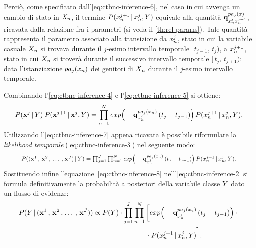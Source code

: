 Perciò, come specificato dall'\autoref{eq:ctbnc-inference-6}, nel caso in cui avvenga un cambio di stato in $\mathnormal{X}_n$, il termine $P(\mathnormal{x}_n^{j+1}\,\arrowvert\,\mathnormal{x}_n^j,\mathnormal{Y})$ equivale alla quantità $\boldsymbol{\textbf{\text{q}}}_{\mathnormal{x}_n^j\mathnormal{x}_n^{j+1}}^{pa_j(\mathnormal{x})}$, ricavata dalla relazione fra i parametri (si veda il \autoref{th:rel-params}). Tale quantità rappresenta il parametro associato alla transizione da $\mathnormal{x}_n^j$, stato in cui la variabile casuale $\mathnormal{X}_n$ si trovava durante il $j$-esimo intervallo temporale $[\,t_{j-1},\,t_j)$, a $\mathnormal{x}_n^{j+1}$, stato in cui $\mathnormal{X}_n$ si troverà durante il successivo intervallo temporale $[\,t_j,\,t_{j+1})$; data l'istanziazione $pa_j(\mathnormal{x}_n)$ dei genitori di $\mathnormal{X}_n$ durante il $j$-esimo intervallo temporale.

Combinando l'\autoref{eq:ctbnc-inference-4} e l'\autoref{eq:ctbnc-inference-5} si ottiene:
\footnotesize
\begin{equation}\label{eq:ctbnc-inference-7}
P(\mathbf{x}^j\,\arrowvert\,\mathnormal{Y})\:P(\mathbf{x}^{j+1}\,\arrowvert\,\mathbf{x}^j,\mathnormal{Y})=\prod_{n=1}^N exp\Big(-\boldsymbol{\textbf{\text{q}}}_{\mathnormal{x}_n^j}^{pa_j(\mathnormal{x}_n)}\,(t_j - t_{j-1})\Big)\,P(\mathnormal{x}_n^{j+1}\,\arrowvert\,\mathnormal{x}_n^j,\mathnormal{Y})\text{\normalsize .}
\end{equation}
\normalsize
Utilizzando l'\autoref{eq:ctbnc-inference-7} appena ricavata è possibile riformulare la \emph{likelihood temporale} (\autoref{eq:ctbnc-inference-3}) nel seguente modo:
\begin{equation}\label{eq:ctbnc-inference-8}
\resizebox{.89\hsize}{!}{$P(\evidencestream{J}\,\arrowvert\,\setel{Y})=\prod_{j=1}^{J}\prod_{n=1}^N exp\Big(-\param{q}_{\setel{x}_n^j}^{pa_j(\setel{x}_n)}\,(t_j - t_{j-1})\Big)\,P(\setel{x}_n^{j+1}\,\arrowvert\,\setel{x}_n^j,\setel{Y})$}\text{.}
\end{equation}
Sostituendo infine l'equazione~\autoref{eq:ctbnc-inference-8} nell'\autoref{eq:ctbnc-inference-2} si formula definitivamente la probabilità a posteriori della variabile classe $\mathnormal{Y}$ dato un flusso di evidenze:
\begin{align}\label{eq:ctbnc-inference-9}
P(\mathnormal{Y}\,\arrowvert\,(\mathbf{x}^1\,,\,\mathbf{x}^2\,,\,\dotsc\,,\,\mathbf{x}^{J})) &\propto P(\mathnormal{Y}) \cdot \prod_{j=1}^{J}\prod_{n=1}^N \bigg[ exp\Big(-\boldsymbol{\textbf{\text{q}}}_{\mathnormal{x}_n^j}^{pa_j(\mathnormal{x}_n)}\,(t_j - t_{j-1})\Big) \cdot \bigg.\nonumber\\
& \qquad \bigg.{} \qquad \qquad \qquad \! \! \cdot P(\mathnormal{x}_n^{j+1}\,\arrowvert\,\mathnormal{x}_n^j,\mathnormal{Y}) \bigg]\text{.}
\end{align}
